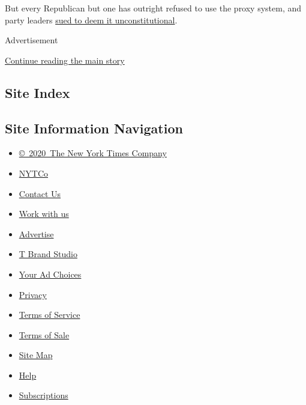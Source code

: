 But every Republican but one has outright refused to use the proxy
system, and party leaders
\href{https://www.nytimes.com/2020/05/26/us/politics/house-lawsuit-proxy-voting-coronavirus.html}{sued
to deem it unconstitutional}.

Advertisement

\protect\hyperlink{after-bottom}{Continue reading the main story}

\hypertarget{site-index}{%
\subsection{Site Index}\label{site-index}}

\hypertarget{site-information-navigation}{%
\subsection{Site Information
Navigation}\label{site-information-navigation}}

\begin{itemize}
\tightlist
\item
  \href{https://help.nytimes.com/hc/en-us/articles/115014792127-Copyright-notice}{©~2020~The
  New York Times Company}
\end{itemize}

\begin{itemize}
\tightlist
\item
  \href{https://www.nytco.com/}{NYTCo}
\item
  \href{https://help.nytimes.com/hc/en-us/articles/115015385887-Contact-Us}{Contact
  Us}
\item
  \href{https://www.nytco.com/careers/}{Work with us}
\item
  \href{https://nytmediakit.com/}{Advertise}
\item
  \href{http://www.tbrandstudio.com/}{T Brand Studio}
\item
  \href{https://www.nytimes.com/privacy/cookie-policy\#how-do-i-manage-trackers}{Your
  Ad Choices}
\item
  \href{https://www.nytimes.com/privacy}{Privacy}
\item
  \href{https://help.nytimes.com/hc/en-us/articles/115014893428-Terms-of-service}{Terms
  of Service}
\item
  \href{https://help.nytimes.com/hc/en-us/articles/115014893968-Terms-of-sale}{Terms
  of Sale}
\item
  \href{https://spiderbites.nytimes.com}{Site Map}
\item
  \href{https://help.nytimes.com/hc/en-us}{Help}
\item
  \href{https://www.nytimes.com/subscription?campaignId=37WXW}{Subscriptions}
\end{itemize}
